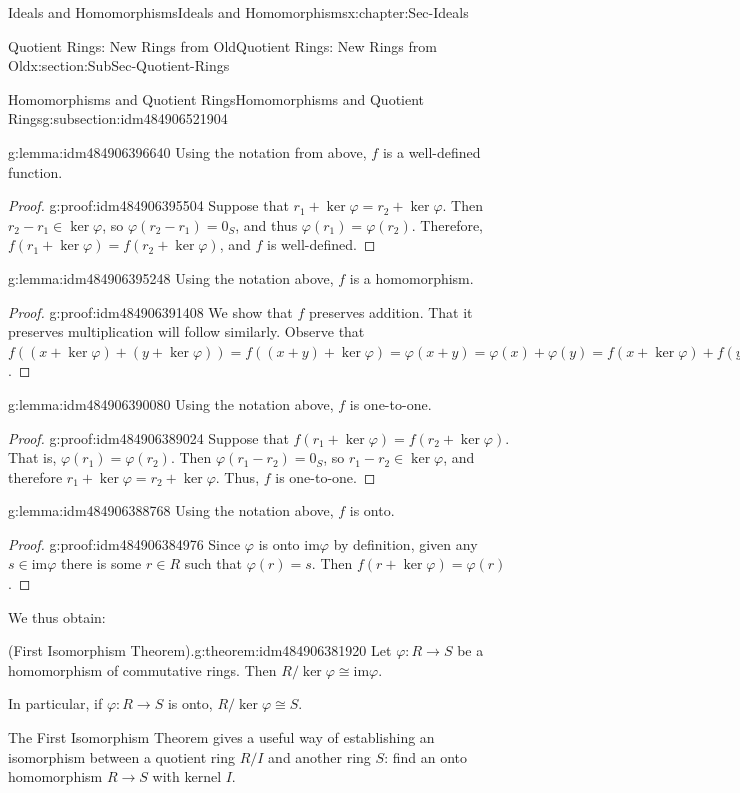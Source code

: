 \documentclass[oneside,10pt,]{book}
\numberwithin{equation}{section}
\def\p{\varphi}
\def\im{\text{im}}
\begin{document}
\begin{chapterptx}{Ideals and Homomorphisms}{}{Ideals and Homomorphisms}{}{}{x:chapter:Sec-Ideals}
\begin{sectionptx}{Quotient Rings: New Rings from Old}{}{Quotient Rings: New Rings from Old}{}{}{x:section:SubSec-Quotient-Rings}
\begin{subsectionptx}{Homomorphisms and Quotient Rings}{}{Homomorphisms and Quotient Rings}{}{}{g:subsection:idm484906521904}
\begin{lemma}{}{}{g:lemma:idm484906396640}%
Using the notation from above, \(f\) is a well-defined function.%
\end{lemma}
\begin{proof}{}{g:proof:idm484906395504}
Suppose that \(r_1 + \ker\p = r_2 + \ker\p\). Then \(r_2-r_1 \in \ker\p\), so \(\p(r_2-r_1) = 0_S\), and thus \(\p(r_1) = \p(r_2)\). Therefore, \(f(r_1+\ker\p) = f(r_2+\ker\p)\), and \(f\) is well-defined.%
\end{proof}
\begin{lemma}{}{}{g:lemma:idm484906395248}%
Using the notation above, \(f\) is a homomorphism.%
\end{lemma}
\begin{proof}{}{g:proof:idm484906391408}
We show that \(f\) preserves addition. That it preserves multiplication will follow similarly. Observe that \(f((x+\ker\p) + (y+\ker\p)) = f((x+y)+\ker\p) = \p(x+y) = \p(x)+\p(y) = f(x+\ker\p) + f(y+\ker\p)\).%
\end{proof}
\begin{lemma}{}{}{g:lemma:idm484906390080}%
Using the notation above, \(f\) is one-to-one.%
\end{lemma}
\begin{proof}{}{g:proof:idm484906389024}
Suppose that \(f(r_1 + \ker\p) = f(r_2 + \ker\p)\). That is, \(\p(r_1) = \p(r_2)\). Then \(\p(r_1 - r_2) = 0_S\), so \(r_1 -r_2 \in \ker\p\), and therefore \(r_1 + \ker\p = r_2 + \ker \p\). Thus, \(f\) is one-to-one.%
\end{proof}
\begin{lemma}{}{}{g:lemma:idm484906388768}%
Using the notation above, \(f\) is onto.%
\end{lemma}
\begin{proof}{}{g:proof:idm484906384976}
Since \(\p\) is onto \(\im \p\) by definition, given any \(s\in \im \p\) there is some \(r\in R\) such that \(\p(r) = s\). Then \(f(r+\ker\p) = \p(r)\).%
\end{proof}
We thus obtain:%
\begin{theorem}{(First Isomorphism Theorem).}{}{g:theorem:idm484906381920}%
%
Let \(\p : R\to S\) be a homomorphism of commutative rings. Then \(R/\ker \p \cong \im \p\).%
\par
In particular, if \(\p : R\to S\) is onto, \(R/\ker \p \cong S\).%
\end{theorem}
The First Isomorphism Theorem gives a useful way of establishing an isomorphism between a quotient ring \(R/I\) and another ring \(S\): find an onto homomorphism \(R\to S\) with kernel \(I\).%

\end{subsectionptx}
\end{sectionptx}
\end{chapterptx}
\end{document}
